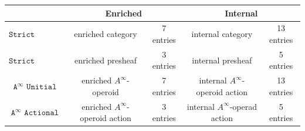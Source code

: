 \documentclass{book}
\theoremstyle{definition}
\begin{document}

\begin{center}
\begin{tabular}{||c||c|c||c|c|}
\hline
\hline
  & \multicolumn{2}{||c||}{Enriched} & \multicolumn{2}{||c||}{Internal} \\
\hline
\hline
$\texttt{Strict Unitial}$  & enriched category & 7 entries & internal category & 13 entries \\ 
\hline
$\texttt{Strict Actional}$ & enriched presheaf & 3 entries & internal presheaf & 5 entries\\ 
\hline
\hline
$\texttt{A}^{\infty}$ $\texttt{Unitial}$  & enriched $A^{\infty}$-operoid & 7 entries & internal $A^{\infty}$-operoid action & 13 entries \\ 
\hline
$\texttt{A}^{\infty}$ $\texttt{Actional}$ & enriched $A^{\infty}$-operoid action & 3 entries & internal $A^{\infty}$-operad action & 5 entries \\ 
\hline
\hline
\end{tabular}
\end{center}
\end{document}
